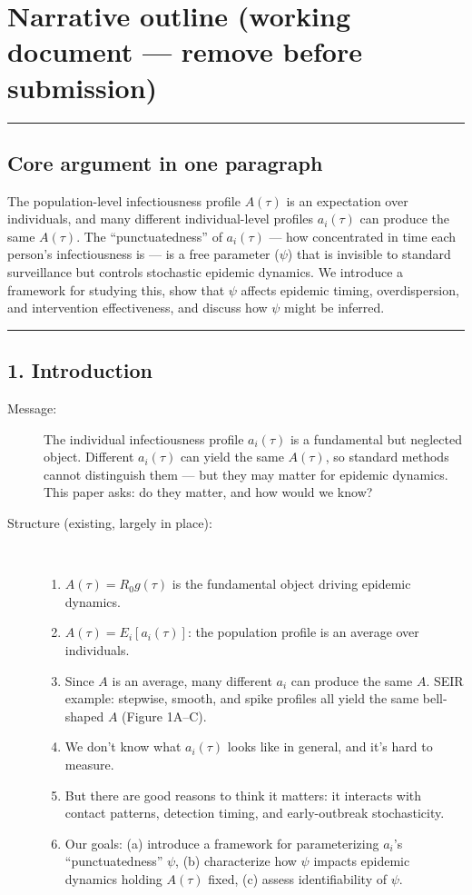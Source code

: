 \clearpage
\section*{Narrative outline (working document --- remove before submission)}

\noindent\rule{\textwidth}{0.4pt}

\subsection*{Core argument in one paragraph}

The population-level infectiousness profile $A(\tau)$ is an expectation over individuals, and many different individual-level profiles $a_i(\tau)$ can produce the same $A(\tau)$. The ``punctuatedness'' of $a_i(\tau)$ --- how concentrated in time each person's infectiousness is --- is a free parameter ($\psi$) that is invisible to standard surveillance but controls stochastic epidemic dynamics. We introduce a framework for studying this, show that $\psi$ affects epidemic timing, overdispersion, and intervention effectiveness, and discuss how $\psi$ might be inferred.

\noindent\rule{\textwidth}{0.4pt}

\subsection*{1. Introduction}

\begin{description}
    \item[Message:] The individual infectiousness profile $a_i(\tau)$ is a fundamental but neglected object. Different $a_i(\tau)$ can yield the same $A(\tau)$, so standard methods cannot distinguish them --- but they may matter for epidemic dynamics. This paper asks: do they matter, and how would we know?

    \item[Structure (existing, largely in place):]~
    \begin{enumerate}
        \item $A(\tau) = R_0 g(\tau)$ is the fundamental object driving epidemic dynamics.
        \item $A(\tau) = E_i[a_i(\tau)]$: the population profile is an average over individuals.
        \item Since $A$ is an average, many different $a_i$ can produce the same $A$. SEIR example: stepwise, smooth, and spike profiles all yield the same bell-shaped $A$ (Figure 1A--C).
        \item We don't know what $a_i(\tau)$ looks like in general, and it's hard to measure.
        \item But there are good reasons to think it matters: it interacts with contact patterns, detection timing, and early-outbreak stochasticity.
        \item Our goals: (a) introduce a framework for parameterizing $a_i$'s ``punctuatedness'' $\psi$, (b) characterize how $\psi$ impacts epidemic dynamics holding $A(\tau)$ fixed, (c) assess identifiability of $\psi$.
    \end{enumerate}
\end{description}

